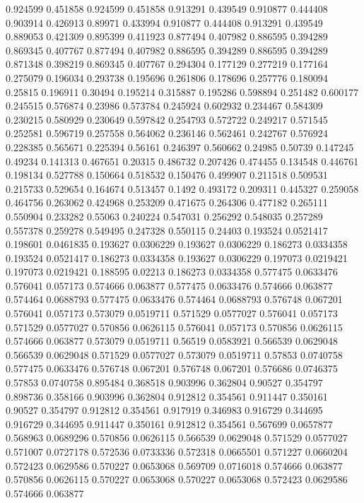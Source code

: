 0.924599 0.451858
0.924599 0.451858
0.913291 0.439549
0.910877 0.444408
0.903914 0.426913
0.89971 0.433994
0.910877 0.444408
0.913291 0.439549
0.889053 0.421309
0.895399 0.411923
0.877494 0.407982
0.886595 0.394289
0.869345 0.407767
0.877494 0.407982
0.886595 0.394289
0.886595 0.394289
0.871348 0.398219
0.869345 0.407767
0.294304 0.177129
0.277219 0.177164
0.275079 0.196034
0.293738 0.195696
0.261806 0.178696
0.257776 0.180094
0.25815 0.196911
0.30494 0.195214
0.315887 0.195286
0.598894 0.251482
0.600177 0.245515
0.576874 0.23986
0.573784 0.245924
0.602932 0.234467
0.584309 0.230215
0.580929 0.230649
0.597842 0.254793
0.572722 0.249217
0.571545 0.252581
0.596719 0.257558
0.564062 0.236146
0.562461 0.242767
0.576924 0.228385
0.565671 0.225394
0.56161 0.246397
0.560662 0.24985
0.50739 0.147245
0.49234 0.141313
0.467651 0.20315
0.486732 0.207426
0.474455 0.134548
0.446761 0.198134
0.527788 0.150664
0.518532 0.150476
0.499907 0.211518
0.509531 0.215733
0.529654 0.164674
0.513457 0.1492
0.493172 0.209311
0.445327 0.259058
0.464756 0.263062
0.424968 0.253209
0.471675 0.264306
0.477182 0.265111
0.550904 0.233282
0.55063 0.240224
0.547031 0.256292
0.548035 0.257289
0.557378 0.259278
0.549495 0.247328
0.550115 0.24403
0.193524 0.0521417
0.198601 0.0461835
0.193627 0.0306229
0.193627 0.0306229
0.186273 0.0334358
0.193524 0.0521417
0.186273 0.0334358
0.193627 0.0306229
0.197073 0.0219421
0.197073 0.0219421
0.188595 0.02213
0.186273 0.0334358
0.577475 0.0633476
0.576041 0.057173
0.574666 0.063877
0.577475 0.0633476
0.574666 0.063877
0.574464 0.0688793
0.577475 0.0633476
0.574464 0.0688793
0.576748 0.067201
0.576041 0.057173
0.573079 0.0519711
0.571529 0.0577027
0.576041 0.057173
0.571529 0.0577027
0.570856 0.0626115
0.576041 0.057173
0.570856 0.0626115
0.574666 0.063877
0.573079 0.0519711
0.56519 0.0583921
0.566539 0.0629048
0.566539 0.0629048
0.571529 0.0577027
0.573079 0.0519711
0.57853 0.0740758
0.577475 0.0633476
0.576748 0.067201
0.576748 0.067201
0.576686 0.0746375
0.57853 0.0740758
0.895484 0.368518
0.903996 0.362804
0.90527 0.354797
0.898736 0.358166
0.903996 0.362804
0.912812 0.354561
0.911447 0.350161
0.90527 0.354797
0.912812 0.354561
0.917919 0.346983
0.916729 0.344695
0.916729 0.344695
0.911447 0.350161
0.912812 0.354561
0.567699 0.0657877
0.568963 0.0689296
0.570856 0.0626115
0.566539 0.0629048
0.571529 0.0577027
0.571007 0.0727178
0.572536 0.0733336
0.572318 0.0665501
0.571227 0.0660204
0.572423 0.0629586
0.570227 0.0653068
0.569709 0.0716018
0.574666 0.063877
0.570856 0.0626115
0.570227 0.0653068
0.570227 0.0653068
0.572423 0.0629586
0.574666 0.063877

